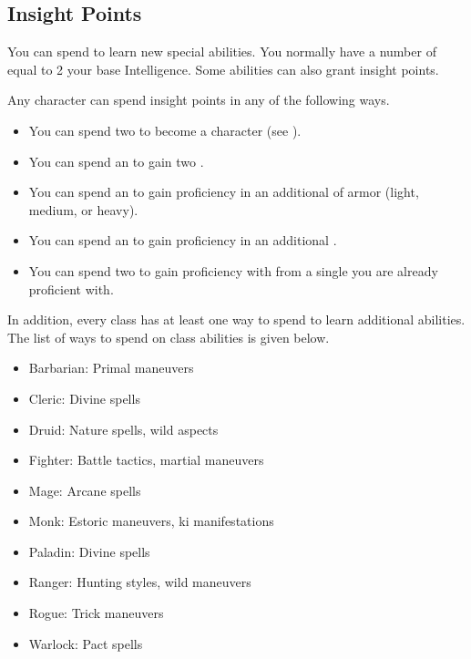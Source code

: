     \subsection{Insight Points}\label{Insight Points}
        You can spend  to learn new special abilities.
        You normally have a number of  equal to 2 \add your base Intelligence.
        Some abilities can also grant insight points.

        Any character can spend insight points in any of the following ways.
        \begin{itemize}
            \item You can spend two  to become a  character (see ).
            \item You can spend an  to gain two .
            \item You can spend an  to gain proficiency in an additional  of armor (light, medium, or heavy).
            \item You can spend an  to gain proficiency in an additional .
            \item You can spend two  to gain proficiency with  from a single  you are already proficient with.
        \end{itemize}
        In addition, every class has at least one way to spend  to learn additional abilities.
        The list of ways to spend  on class abilities is given below.
        \begin{itemize}
            \item Barbarian: Primal maneuvers
            \item Cleric: Divine spells
            \item Druid: Nature spells, wild aspects
            \item Fighter: Battle tactics, martial maneuvers
            \item Mage: Arcane spells
            \item Monk: Estoric maneuvers, ki manifestations
            \item Paladin: Divine spells
            \item Ranger: Hunting styles, wild maneuvers
            \item Rogue: Trick maneuvers
            \item Warlock: Pact spells
        \end{itemize}

